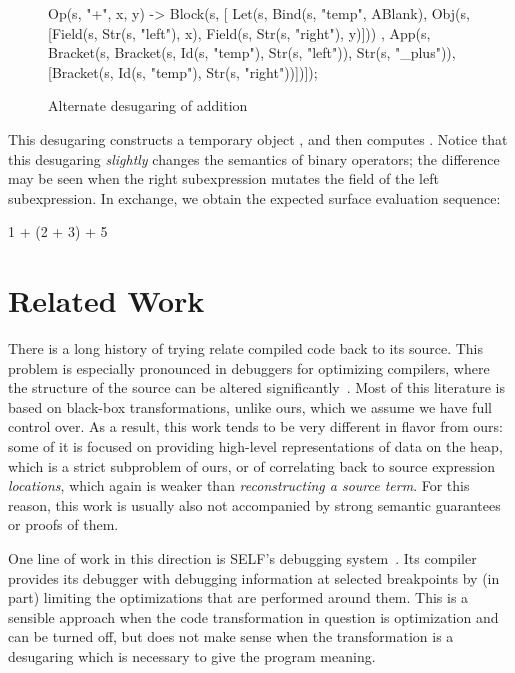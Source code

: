 \begin{figure}[t]
\begin{codeex}
  Op(s, "+", x, y) ->
    Block(s,
    [ Let(s, Bind(s, "temp", ABlank),
             Obj(s, [Field(s, Str(s, "left"), x),
                     Field(s, Str(s, "right"), y)]))
    , App(s, Bracket(s, Bracket(s, Id(s, "temp"),
                                   Str(s, "left")),
                        Str(s, "_plus")),
             [Bracket(s, Id(s, "temp"),
                         Str(s, "right"))])]);
\end{codeex}
\caption{Alternate desugaring of addition}
\label{fig:reval-alt-plus}
\end{figure}
This desugaring constructs a temporary object , and then computes . Notice that
this desugaring \emph{slightly} changes the semantics of binary operators;
the difference may be seen when the right subexpression mutates the
 field of the left subexpression. In exchange, we obtain the
expected surface evaluation sequence:
\begin{codeex}
    1 + (2 + 3)  + 5 
\end{codeex}





\section{Related Work}

There is a long history of trying relate compiled code back to its
source. This problem is especially pronounced in debuggers for
optimizing compilers, where the structure of the source can be altered
significantly~\cite{hennessy-debugging}. Most of this literature
is based on black-box
transformations, unlike ours, which we assume we have full control
over.  As a result, this work tends to be very different in flavor
from ours: some of it is focused on providing high-level
representations of data on the heap, which is a strict subproblem of
ours, or of correlating back to source expression \emph{locations}, which
again is weaker than \emph{reconstructing a source term}.
For this reason,
this work is usually also not accompanied by strong semantic
guarantees or proofs of them.

One line of work in this direction is SELF's debugging
system~\cite{self-debugging}. Its compiler provides its debugger with
debugging information at selected breakpoints by (in part) limiting the
optimizations that are performed around them. This is a sensible approach
when the code transformation in question is optimization and can be turned
off, but does not make sense when the transformation is a desugaring
which is necessary to give the program meaning.

